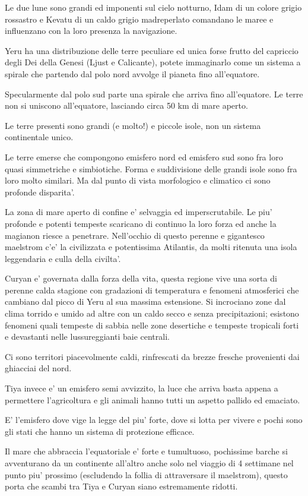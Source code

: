 \documentclass[a4paper,11pt,twoside,openany]{book}
\begin{document}
{		Le due lune sono grandi ed imponenti sul cielo notturno, Idam di un colore grigio rossastro e Kevatu di un caldo grigio madreperlato comandano le maree e influenzano con la loro presenza la navigazione. 
		
		Yeru ha una distribuzione delle terre peculiare ed unica forse frutto del capriccio degli Dei della Genesi (Ljust e Calicante), potete immaginarlo come un sistema a spirale che partendo dal polo nord avvolge il pianeta fino all'equatore. 
		
		Specularmente dal polo sud parte una spirale che arriva fino all'equatore. Le terre non si uniscono all'equatore, lasciando circa 50 km di mare aperto.
		
		Le terre presenti sono grandi (e molto!) e piccole isole, non un sistema continentale unico.
		
		Le terre emerse che compongono emisfero nord ed emisfero sud sono fra loro quasi simmetriche e simbiotiche. Forma e suddivisione delle grandi isole sono fra loro molto similari. Ma dal punto di vista morfologico e climatico ci sono profonde disparita'.
		
		La zona di mare aperto di confine e' selvaggia ed imperscrutabile. Le piu' profonde e potenti tempeste scaricano di continuo la loro forza ed anche la magianon riesce a penetrare. Nell'occhio di questo perenne e gigantesco maelstrom c'e' la civilizzata e potentissima Atilantis, da molti ritenuta una isola leggendaria e culla della civilta'.
		
		Curyan e' governata dalla forza della vita, questa regione vive una sorta di perenne calda stagione con gradazioni di temperatura e fenomeni atmosferici che cambiano dal picco di Yeru al sua massima estensione. Si incrociano zone dal clima torrido e umido ad altre con un caldo secco e senza precipitazioni; esistono fenomeni quali tempeste di sabbia nelle zone desertiche e tempeste tropicali forti e devastanti nelle lussureggianti baie centrali.
		
		Ci sono territori piacevolmente caldi, rinfrescati da brezze fresche provenienti dai ghiacciai del nord.
		
		Tiya invece e' un emisfero semi avvizzito, la luce che arriva basta appena a permettere l'agricoltura e gli animali hanno tutti un aspetto pallido ed emaciato.
		
		E' l'emisfero dove vige la legge del piu' forte, dove si lotta per vivere e pochi sono gli stati che hanno un sistema di protezione efficace.
		
		Il mare che abbraccia l'equatoriale e' forte e tumultuoso, pochissime barche si avventurano da un continente all'altro anche solo nel viaggio di 4 settimane nel punto piu' prossimo (escludendo la follia di attraversare il maelstrom), questo porta che scambi tra Tiya e Curyan siano estremamente ridotti.
		
}
\end{document}
